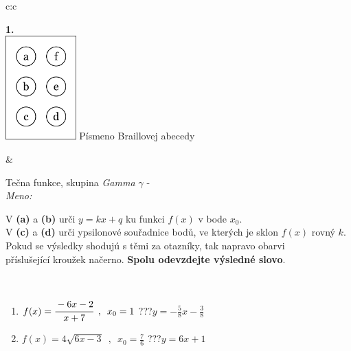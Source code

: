 \documentclass[10pt]{report}
\begin{document}
\begin{tabular}{c:c}
\begin{minipage}[c][104.5mm][t]{0.5\linewidth}
\begin{center}
\begin{minipage}{0.20\linewidth}
\begin{center}
{\Huge\bfseries 1.} \\[2mm]
\includegraphics[height=40mm]{../images/braille.png}
{\small Písmeno Braillovej abecedy}
\end{center}
\end{minipage}
\end{center}
\end{minipage}
&
\begin{minipage}[c][104.5mm][t]{0.5\linewidth}
\begin{center}
\vspace{7mm}
{\huge Tečna funkce, skupina \textit{Gamma $\gamma$} -}\\[5mm]
\textit{Meno:}\phantom{xxxxxxxxxxxxxxxxxxxxxxxxxxxxxxxxxxxxxxxxxxxxxxxxxxxxxxxxxxxxxxxxx}\\[5mm]
\begin{minipage}{0.95\linewidth}
\begin{center}
V \textbf{(a)} a \textbf{(b)} urči  $y = kx + q$ ku funkci $f(x)$ v bode $x_0$.\\V \textbf{(c)} a \textbf{(d)} urči ypsilonové souřadnice bodů, ve kterých je sklon $f(x)$ rovný $k$.\\Pokud se výsledky shodujú s těmi za otazníky, tak napravo obarvi\\příslušející kroužek načerno. \textbf{Spolu odevzdejte výsledné slovo}.
\end{center}
\end{minipage}
\\[1mm]
\begin{minipage}{0.79\linewidth}
\begin{center}
\begin{varwidth}{\linewidth}
\begin{enumerate}
\small
\item $f(x)=\cfrac{-6x-2}{x+7}\enspace , \enspace x_0=1$\quad \dotfill\; ???\;\dotfill \quad $y = -\frac{5}{8}x-\frac{3}{8}$
\item $f(x)=4\sqrt{6x-3}\enspace , \enspace x_0=\frac{7}{6}$\quad \dotfill\; ???\;\dotfill \quad $y = 6x+1$

\end{enumerate}
\end{varwidth}
\end{center}
\end{minipage}
\end{center}
\end{minipage}
\end{tabular}
\end{document}
